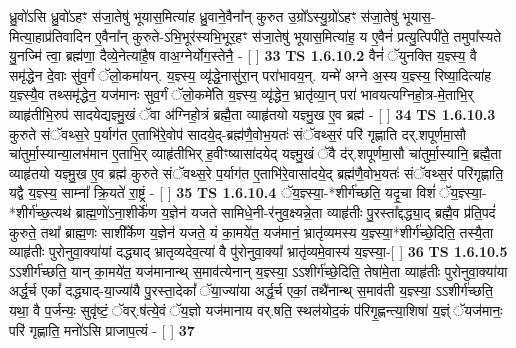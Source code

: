 \documentclass[17pt]{extarticle}
\begin{document}
                  ध्रु॒वो॑ऽसि ध्रु॒वो॑ऽहꣳ स॑जा॒तेषु॑ भूयास॒मित्या॑ह ध्रु॒वाने॒वैना᳚न् कुरुत उ॒ग्रो᳚ऽस्यु॒ग्रो॑ऽहꣳ स॑जा॒तेषु॑ भूयास॒-मित्या॒हाप्र॑तिवादिन ए॒वैना᳚न् कुरुते-ऽभि॒भूर॑स्यभि॒भूर॒हꣳ स॑जा॒तेषु॑ भूयास॒मित्या॑ह॒ य ए॒वैनं॑ प्रत्यु॒त्पिपी॑ते॒ तमुपा᳚स्यते यु॒नज्मि॑ त्वा॒ ब्रह्म॑णा॒ दैव्ये॒नेत्या॑है॒ष वाअ॒ग्नेर्योग॒स्तेनै॒ - [ ] \textbf{  33} \newline
                  \newline
                                \textbf{ TS 1.6.10.2} \newline
                  वैनं॑ ॅयुनक्ति य॒ज्ञ्स्य॒ वै समृ॑द्धेन दे॒वाः सु॑व॒र्गं ॅलो॒कमा॑यन्. य॒ज्ञ्स्य॒ व्यृ॑द्धे॒नासु॑रा॒न् परा॑भावय॒न्. यन्मे॑ अग्ने अ॒स्य य॒ज्ञ्स्य॒ रिष्या॒दित्या॑ह य॒ज्ञ्स्यै॒व तथ्समृ॑द्धेन॒ यज॑मानः सुव॒र्गं ॅलो॒कमे॑ति य॒ज्ञ्स्य॒ व्यृ॑द्धेन॒ भ्रातृ॑व्या॒न् परा॑ भावयत्यग्निहो॒त्र-मे॒ताभि॒र् व्याहृ॑तीभि॒रुप॑ सादयेद्यज्ञ्मु॒खं ॅवा अ॑ग्निहो॒त्रं ब्रह्मै॒ता व्याहृ॑तयो यज्ञ्मु॒ख ए॒व ब्रह्म॑ - [ ] \textbf{  34} \newline
                  \newline
                                \textbf{ TS 1.6.10.3} \newline
                  कुरुते संॅवथ्स॒रे प॒र्याग॑त ए॒ताभि॑रे॒वोप॑ सादये॒द्-ब्रह्म॑णै॒वोभ॒यतः॑ संॅवथ्स॒रं परि॑ गृह्णाति दर्.शपूर्णमा॒सौ चा॑तुर्मा॒स्यान्या॒लभ॑मान ए॒ताभि॒र् व्याहृ॑तीभिर् ह॒वीꣳष्यासा॑दयेद् यज्ञ्मु॒खं ॅवै द॑र्.शपूर्णमा॒सौ चा॑तुर्मा॒स्यानि॒ ब्रह्मै॒ता व्याहृ॑तयो यज्ञ्मु॒ख ए॒व ब्रह्म॑ कुरुते संॅवथ्स॒रे प॒र्याग॑त ए॒ताभि॑रे॒वासा॑दये॒द् ब्रह्म॑णै॒वोभ॒यतः॑ संॅवथ्स॒रं परि॑गृह्णाति॒ यद्वै य॒ज्ञ्स्य॒ साम्ना᳚ क्रि॒यते॑ रा॒ष्ट्रं - [ ] \textbf{  35} \newline
                  \newline
                                \textbf{ TS 1.6.10.4} \newline
                  ॅय॒ज्ञ्स्या॒-*शीर्ग॑च्छति॒ यदृ॒चा विशं॑ ॅय॒ज्ञ्स्या॒- *शीर्ग॑च्छ॒त्यथ॑ ब्राह्म॒णो॑ऽना॒शीर्के॑ण य॒ज्ञेन॑ यजते सामिधे॒नी-र॑नुव॒क्ष्यन्ने॒ता व्याहृ॑तीः पु॒रस्ता᳚द्दद्ध्या॒द् ब्रह्मै॒व प्र॑ति॒पदं॑ कुरुते॒ तथा᳚ ब्राह्म॒णः साशी᳚र्केण य॒ज्ञेन॑ यजते॒ यं का॒मये॑त॒ यज॑मानं॒ भ्रातृ॑व्यमस्य य॒ज्ञ्स्या॒*शीर्ग॑च्छे॒दिति॒ तस्यै॒ता व्याहृ॑तीः पुरोनुवा॒क्या॑यां दद्ध्याद् भ्रातृव्यदेव॒त्या॑ वै पु॑रोनुवा॒क्या᳚ भ्रातृ॑व्यमे॒वास्य॑ य॒ज्ञ्स्या॒-[ ] \textbf{  36} \newline
                  \newline
                                \textbf{ TS 1.6.10.5} \newline
                  ऽऽशीर्ग॑च्छति॒ यान् का॒मये॑त॒ यज॑मानान्थ् स॒माव॑त्येनान् य॒ज्ञ्स्या॒ ऽऽशीर्ग॑च्छे॒दिति॒ तेषा॑मे॒ता व्याहृ॑तीः पुरोनुवा॒क्या॑या अर्द्ध॒र्च एकां᳚ दद्ध्याद्-या॒ज्या॑यै पु॒रस्ता॒देकां᳚ ॅया॒ज्या॑या अर्द्ध॒र्च एकां॒ तथै॑नान्थ् स॒माव॑ती य॒ज्ञ्स्या॒ ऽऽशीर्ग॑च्छति॒ यथा॒ वै प॒र्जन्यः॒ सुवृ॑ष्टं॒ ॅवर्.ष॑त्ये॒वं ॅय॒ज्ञो यज॑मानाय वर्.षति॒ स्थल॑योद॒कं प॑रिगृ॒ह्णन्त्या॒शिषा॑ य॒ज्ञ्ं ॅयज॑मानः॒ परि॑ गृह्णाति॒ मनो॑ऽसि प्राजाप॒त्यं - [ ] \textbf{  37} \newline
\end{document}
